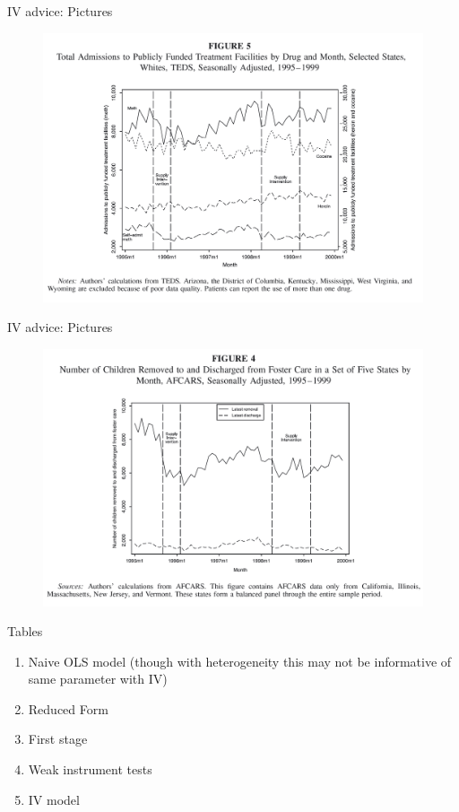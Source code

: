 \documentclass{beamer}
\begin{document}
\begin{frame}{IV advice: Pictures}
	
	\begin{figure}
	\includegraphics[scale=0.15]{./lecture_includes/keith_3.png}
	\end{figure}
	
\end{frame}

\begin{frame}{IV advice: Pictures}
	
	\begin{figure}
	\includegraphics[scale=0.15]{./lecture_includes/keith_2.png}
	\end{figure}
	
\end{frame}

\begin{frame}{Tables}

\begin{enumerate}
\item Naive OLS model (though with heterogeneity this may not be informative of same parameter with IV)
\item Reduced Form
\item First stage
\item Weak instrument tests
\item IV model
\end{enumerate}

\end{frame}
\end{document}

